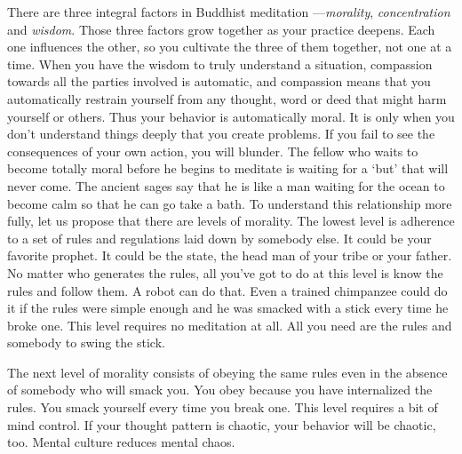 There are three integral factors in Buddhist meditation ---\emph{morality},
\emph{concentration} and \emph{wisdom}. Those three factors grow together as your practice
deepens. Each one influences the other, so you cultivate the three of them
together, not one at a time. When you have the wisdom to truly understand a
situation, compassion towards all the parties involved is automatic, and
compassion means that you automatically restrain yourself from any thought, word
or deed that might harm yourself or others. Thus your behavior is automatically
moral. It is only when you don't understand things deeply that you create
problems. If you fail to see the consequences of your own action, you will
blunder. The fellow who waits to become totally moral before he begins to
meditate is waiting for a `but' that will never come. The ancient sages say that
he is like a man waiting for the ocean to become calm so that he can go take a
bath. To understand this relationship more fully, let us propose that there are
levels of morality. The lowest level is adherence to a set of rules and
regulations laid down by somebody else. It could be your favorite prophet. It
could be the state, the head man of your tribe or your father. No matter who
generates the rules, all you've got to do at this level is know the rules and
follow them. A robot can do that. Even a trained chimpanzee could do it if the
rules were simple enough and he was smacked with a stick every time he broke
one. This level requires no meditation at all. All you need are the rules and
somebody to swing the stick.

The next level of morality consists of obeying the same rules even in the
absence of somebody who will smack you. You obey because you have internalized
the rules. You smack yourself every time you break one. This level requires a
bit of mind control. If your thought pattern is chaotic, your behavior will be
chaotic, too. Mental culture reduces mental chaos.

